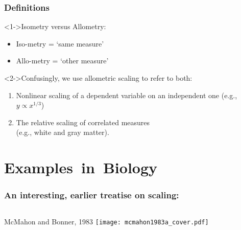 \begin{frame}
  \frametitle{Definitions}

  \begin{block}<1->{Isometry versus Allometry:}
    \begin{itemize}
    \item 
      Iso-metry = `same measure'
    \item 
      Allo-metry = `other measure'
    \end{itemize}
  \end{block}

  \bigskip

  \begin{block}<2->{Confusingly, we use allometric scaling to refer to both:}
    \begin{enumerate}
    \item<3-> 
      Nonlinear scaling of a dependent variable
      on an independent one (e.g., $y \propto x^{1/3}$)
    \item<4->
      The relative scaling of correlated measures\\
      (e.g., white and gray matter).
    \end{enumerate}
  \end{block}

\end{frame}


\section{Examples\ in\ Biology}

\begin{frame}
  \frametitle{An interesting, earlier treatise on scaling:}

  \begin{columns}
    McMahon and Bonner, 1983\cite{mcmahon1983a}
    \texttt{[image: mcmahon1983a\_cover.pdf]}
  \end{columns}

\end{frame}



